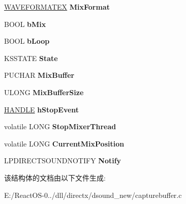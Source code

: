 \begin{DoxyCompactItemize}
\item 
\mbox{\label{struct_c_direct_sound_capture_buffer_impl_ae1a50d6cf0cad391d07154a35a169cc2}} 
\hyperlink{struct_w_a_v_e_f_o_r_m_a_t_e_x}{W\+A\+V\+E\+F\+O\+R\+M\+A\+T\+EX} {\bfseries Mix\+Format}
\item 
\mbox{\label{struct_c_direct_sound_capture_buffer_impl_a5bf89ef34a781f05e8fd9989594908fa}} 
B\+O\+OL {\bfseries b\+Mix}
\item 
\mbox{\label{struct_c_direct_sound_capture_buffer_impl_a58524653e2d7b9a0cdc3ed729fb28631}} 
B\+O\+OL {\bfseries b\+Loop}
\item 
\mbox{\label{struct_c_direct_sound_capture_buffer_impl_ac98a7e31aa4c85a3166f84c6f2d554bf}} 
K\+S\+S\+T\+A\+TE {\bfseries State}
\item 
\mbox{\label{struct_c_direct_sound_capture_buffer_impl_aa4ba893e481973a67ed1d5832f1e3afa}} 
P\+U\+C\+H\+AR {\bfseries Mix\+Buffer}
\item 
\mbox{\label{struct_c_direct_sound_capture_buffer_impl_ac7e5daeed93046eff45d0394fdffe4d8}} 
U\+L\+O\+NG {\bfseries Mix\+Buffer\+Size}
\item 
\mbox{\label{struct_c_direct_sound_capture_buffer_impl_a50bd56df50338f0e5783e1a2e651bdb9}} 
\hyperlink{interfacevoid}{H\+A\+N\+D\+LE} {\bfseries h\+Stop\+Event}
\item 
\mbox{\label{struct_c_direct_sound_capture_buffer_impl_a8cbad8139d264c97449b0e3bce2bfe94}} 
volatile L\+O\+NG {\bfseries Stop\+Mixer\+Thread}
\item 
\mbox{\label{struct_c_direct_sound_capture_buffer_impl_a4068baa62d75a64b27160043bd7319d2}} 
volatile L\+O\+NG {\bfseries Current\+Mix\+Position}
\item 
\mbox{\label{struct_c_direct_sound_capture_buffer_impl_a1908a2d6b0658ce3ecf136b7ca00e2ae}} 
L\+P\+D\+I\+R\+E\+C\+T\+S\+O\+U\+N\+D\+N\+O\+T\+I\+FY {\bfseries Notify}
\end{DoxyCompactItemize}


该结构体的文档由以下文件生成\+:\begin{DoxyCompactItemize}
\item 
E\+:/\+React\+O\+S-\/0../dll/directx/dsound\+\_\+new/capturebuffer.\+c\end{DoxyCompactItemize}
